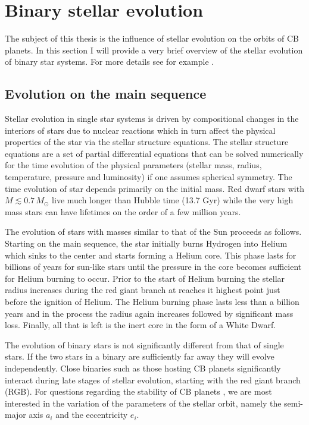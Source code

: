 \documentclass[twoside,openright,titlepage,numbers=noenddot,headinclude,%
                footinclude=true,cleardoublepage=empty,abstractoff, 
                BCOR=5mm,paper=a4,fontsize=11pt,%
                american,%
                ]{scrreprt}%
\begin{document}
\section{Binary stellar evolution}
\label{sec:stellar_evolution}
The subject of this thesis is the influence of stellar evolution on the orbits
of CB planets. In this section I will provide a very brief overview of the
stellar evolution of binary star systems. For more details see for example
\citet{prialnik2009}.
\subsection{Evolution on the main sequence}
\label{sub:Evolution on the main sequence}
Stellar evolution in single star systems
is driven by compositional changes in the interiors of stars due to nuclear 
reactions which in turn affect the physical properties of the star 
via the stellar structure equations. The stellar structure equations
\citep[see for ex.]{prialnik2009} are a set of partial differential equations
that can be solved numerically for the time evolution of the 
physical parameters 
(stellar mass, radius, temperature, pressure and luminosity) if one assumes 
spherical symmetry. The time evolution of star depends primarily on the 
initial mass. Red dwarf stars with $M\lesssim 0.7\,M_\odot$ live much longer
than Hubble time (13.7 Gyr) while the very high mass stars can have lifetimes
on the order of a few million years.

The evolution of stars with masses similar to that of the Sun proceeds as 
follows. Starting on the main sequence, the star initially burns
Hydrogen into Helium which sinks to the center and starts forming a Helium
core. This phase lasts for billions of years for sun-like stars until the 
pressure in the core becomes sufficient for Helium burning to occur. Prior
to the start of Helium burning the stellar radius increases during the red
giant branch at reaches it highest point just before the ignition of Helium.
The
Helium burning phase lasts less than a billion years and in the process the 
radius again increases followed by significant mass loss. Finally, all that is
left is 
the inert core in the form of a White Dwarf.


The evolution of binary stars is not significantly different from that of 
single stars. If the two stars in a binary are 
sufficiently far away they will evolve independently. 
Close binaries such as those hosting CB planets significantly 
interact during late stages of stellar evolution, starting with the 
red giant branch (RGB). For questions regarding the stability of CB planets
, we are most interested in the variation of the parameters of the stellar 
orbit, namely the semi-major axis $a_i$ and
the eccentricity $e_i$. 
\end{document}
